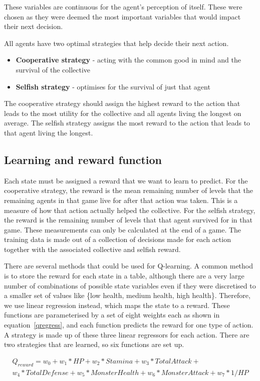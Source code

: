 These variables are continuous for the agent's perception of itself. These were chosen as they were deemed the most important variables that would impact their next decision. 

All agents have two optimal strategies that help decide their next action.
\begin{itemize}
    \item \textbf{Cooperative strategy} - acting with the common good in mind and the survival of the collective
    \item \textbf{Selfish strategy} - optimises for the survival of just that agent
\end{itemize}
The cooperative strategy should assign the highest reward to the action that leads to the most utility for the collective and all agents living the longest on average. The selfish strategy assigns the most reward to the action that leads to that agent living the longest.

\subsection{Learning and reward function}
Each state must be assigned a reward that we want to learn to predict. For the cooperative strategy, the reward is the mean remaining number of levels that the remaining agents in that game live for after that action was taken. This is a measure of how that action actually helped the collective. For the selfish strategy, the reward is the remaining number of levels that that agent survived for in that game. These measurements can only be calculated at the end of a game. The training data is made out of a collection of decisions made for each action together with the associated collective and selfish reward.

There are several methods that could be used for Q-learning. A common method is to store the reward for each state in a table, although there are a very large number of combinations of possible state variables even if they were discretised to a smaller set of values like \{low health, medium health, high health\}. Therefore, we use linear regression instead, which maps the state to a reward. These functions are parameterised by a set of eight weights each as shown in equation~\ref{qregress}, and each function predicts the reward for one type of action. A strategy is made up of these three linear regressors for each action. There are two strategies that are learned, so six functions are set up. 

\begin{equation}\label{qregress}
\begin{aligned}
Q_{reward} = w_0 + w_1 * HP + w_2 * Stamina + w_3 * TotalAttack + \\
w_4 * TotalDefense + w_5 * MonsterHealth + w_6 * MonsterAttack + w_7 * 1 / HP
\end{aligned}
\end{equation}

